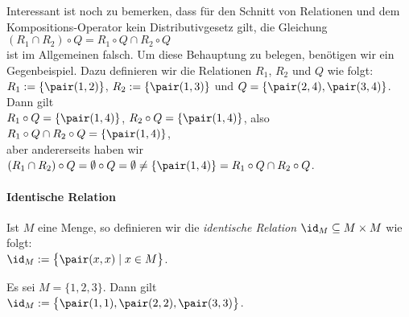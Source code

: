 Interessant ist noch zu bemerken, dass für den Schnitt von Relationen
und dem Kompositions-Operator kein Distributivgesetz gilt, die Gleichung
\\[0.2cm]
\hspace*{1.3cm}
$(R_1 \cap R_2) \circ Q = R_1 \circ Q \cap R_2 \circ Q$
\\[0.2cm]
ist im Allgemeinen falsch.  Um diese Behauptung zu belegen, benötigen wir ein Gegenbeispiel.
Dazu definieren wir die Relationen $R_1$, $R_2$ und $Q$ wie folgt: \\[0.2cm]
\hspace*{1.3cm} $R_1 := \{ \pair(1,2) \}$, \quad $R_2 := \{ \pair(1,3) \}$ \quad und \quad
                $Q = \{ \pair(2,4), \pair(3,4) \}$. \\[0.2cm]
Dann gilt \\[0.2cm]
\hspace*{1.3cm} $R_1 \circ Q = \{ \pair(1,4) \}$, \quad $R_2 \circ Q = \{ \pair(1,4) \}$, \quad also
                $R_1 \circ Q \cap R_2 \circ Q = \{ \pair(1,4) \}$, \\[0.2cm]
aber andererseits haben wir \\[0.2cm]
\hspace*{1.3cm} $(R_1 \cap R_2) \circ Q  = \emptyset \circ Q = \emptyset \not= \{\pair(1,4) \} = R_1 \circ Q  \cap R_2 \circ Q$. 

\paragraph{Identische Relation} Ist $M$ eine Menge, so definieren wir die \emph{identische Relation} $\id_M \subseteq M \times M$
wie folgt: \\[0.2cm]
\hspace*{1.3cm} $\id_M := \bigl\{ \pair(x,x) \mid x \in M \bigr\}$. 
\vspace*{0.2cm}

\example
Es sei $M = \{1,2,3\}$.  Dann gilt \\[0.2cm]
\hspace*{1.3cm}  $\id_M := \bigl\{ \pair(1,1),  \pair(2,2),  \pair(3,3) \bigr\}$.
\vspace*{0.2cm}

